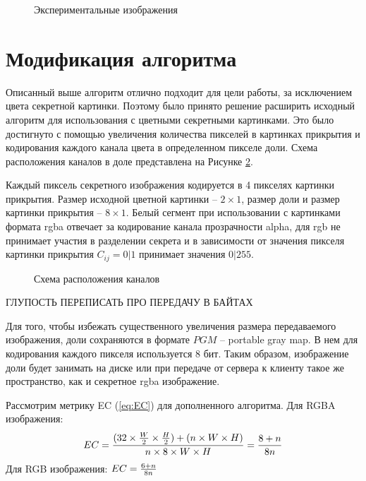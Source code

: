 \documentclass[a4paper,article,14pt]{extarticle}
\begin{document}
\begin{figure}[ph!]
\begin{minipage}[h]{0.3\linewidth}
    \end{minipage}
    \caption{Экспериментальные изображения}
    \label{fig:experimental_grey_images}
\end{figure}

\newpage
\section{Модификация алгоритма}

Описанный выше алгоритм отлично подходит для цели работы, за исключением цвета секретной картинки. Поэтому
было принято решение расширить исходный алгоритм для использования с цветными секретными картинками. 
Это было достигнуто с помощью увеличения количества пикселей в картинках прикрытия и кодирования каждого канала цвета 
в определенном пикселе доли. Схема расположения каналов в доле представлена на Рисунке \ref{fig:channels}. 

Каждый пиксель секретного изображения кодируется в 4 пикселях картинки прикрытия.
Размер исходной цветной картинки -- $2\times 1$, размер доли и размер картинки прикрытия -- $8 \times 1$.
Белый сегмент при использовании с картинками формата rgba отвечает за кодирование канала прозрачности alpha,
для rgb не принимает участия в разделении секрета и в зависимости от значения пикселя картинки прикрытия $C_{ij} = 0 | 1$ принимает значения $0 | 255$.

\begin{figure}[h]
    \caption{Схема расположения каналов}
    \label{fig:channels}
\end{figure}


ГЛУПОСТЬ ПЕРЕПИСАТЬ ПРО ПЕРЕДАЧУ В БАЙТАХ

Для того, чтобы избежать существенного увеличения размера передаваемого изображения, доли сохраняются в формате $PGM$ -- portable gray map. В нем для 
кодирования каждого пикселя используется 8 бит. Таким образом, изображение доли будет занимать на диске или при передаче
от сервера к клиенту такое же пространство, как и секретное rgba изображение.

Рассмотрим метрику EC (\ref{eq:EC}) для дополненного алгоритма. Для RGBA изображения: 
$$EC = {{(32 \times {W \over 2} \times {H \over 2}) + (n \times W \times H)} \over
{n \times 8 \times W \times H}} = {8+n \over 8n}$$
Для RGB изображения:
$EC = {6+n \over 8n}$
\end{document}

